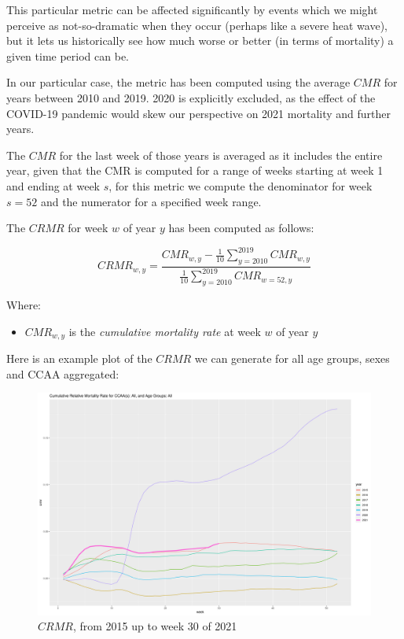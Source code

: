 \documentclass[
  a4paper]{article}
\providecommand{\tightlist}{%
  \setlength{\itemsep}{0pt}\setlength{\parskip}{0pt}}
\begin{document}
This particular metric can be affected significantly by events which we
might perceive as not-so-dramatic when they occur (perhaps like a severe
heat wave), but it lets us historically see how much worse or better (in
terms of mortality) a given time period can be.

In our particular case, the metric has been computed using the average
\(CMR\) for years between 2010 and 2019. 2020 is explicitly excluded, as
the effect of the COVID-19 pandemic would skew our perspective on 2021
mortality and further years.

The \(CMR\) for the last week of those years is averaged as it includes
the entire year, given that the CMR is computed for a range of weeks
starting at week 1 and ending at week \(s\), for this metric we compute
the denominator for week \(s=52\) and the numerator for a specified week
range.

The \(CRMR\) for week \(w\) of year \(y\) has been computed as follows:

\[CRMR_{w, y} = \frac{CMR_{w, y} - \frac{1}{10} \sum^{2019}_{y=2010} CMR_{w, y}}{\frac{1}{10} \sum^{2019}_{y=2010} CMR_{w=52, y}}\]

Where:

\begin{itemize}
\tightlist
\item
  \(CMR_{w, y}\) is the \emph{cumulative mortality rate} at week \(w\)
  of year \(y\)
\end{itemize}

Here is an example plot of the \(CRMR\) we can generate for all age
groups, sexes and CCAA aggregated:

\begin{figure}
\centering
\includegraphics{./images/crmr.png}
\caption{\(CRMR\), from 2015 up to week 30 of 2021}
\end{figure}
\end{document}
